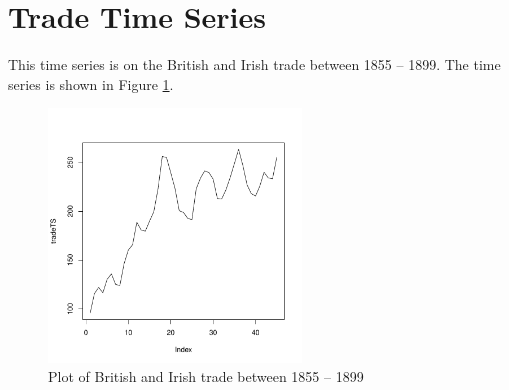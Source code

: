 \documentclass[12pt]{article}
\begin{document}
\thispagestyle{empty}

\section{Trade Time Series}

This time series is on the British and Irish trade between 1855 -- 1899. The time series is shown in Figure \ref{fig:tsplot}.



\begin{figure}[ht]
\begin{center}
\includegraphics[width=0.6\textwidth]{project-tsplot}
\end{center}
\caption{Plot of British and Irish trade between 1855 -- 1899}
\label{fig:tsplot}
\end{figure}
\end{document}
